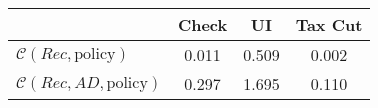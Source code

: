\begin{tabular}{@{}lccc@{}} 
\toprule 
                          & Check      & UI    & Tax Cut    \\  \midrule 
$\mathcal{C}(Rec,\text{policy})$ & 0.011  & 0.509  & 0.002     \\ 
$\mathcal{C}(Rec, AD,\text{policy})$ & 0.297  & 1.695  & 0.110     \\ 
\end{tabular}  
